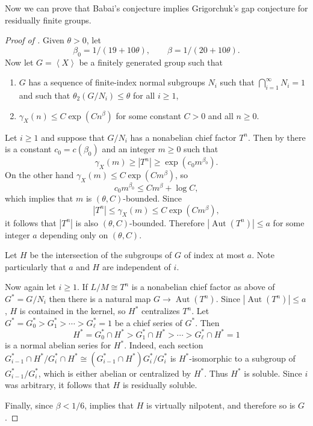 \documentclass[11pt,reqno]{amsart}
\numberwithin{equation}{section}
\theoremstyle{definition}
\theoremstyle{remark}
\newcommand\opr[1]{\operatorname{#1}}
\def\Aut{\opr{Aut}}
\newcommand\gen[1]{\left\langle#1\right\rangle}
\numberwithin{equation}{section}
\begin{document}
Now we can prove that Babai's conjecture implies Grigorchuk's gap conjecture for residually finite groups.

\begin{proof}[Proof of ]
    Given $\theta > 0$, let
    \[
        \beta_0 = 1/(19 + 10 \theta), \qquad \beta = 1 / (20 + 10 \theta).
    \]
    Now let $G = \gen X$ be a finitely generated group such that
    \begin{enumerate}
        \item $G$ has a sequence of finite-index normal subgroups $N_i$ such that $\bigcap_{i=1}^\infty N_i = 1$ and such that $\theta_2(G/N_i) \le \theta$ for all $i \ge 1$,
        \item $\gamma_X(n) \le C \exp(C n^\beta)$ for some constant $C > 0$ and all $n \ge 0$.
    \end{enumerate}

    Let $i \ge 1$ and suppose that $G / N_i$ has a nonabelian chief factor $T^n$.
    Then by  there is a constant $c_0 = c(\beta_0)$ and an integer $m \ge 0$ such that
    \[
        \gamma_X(m) \ge |T^n| \ge \exp(c_0 m^{\beta_0}).
    \]
    On the other hand $\gamma_X(m) \le C \exp(C m^\beta)$, so
    \[
        c_0 m^{\beta_0} \le C m^\beta + \log C,
    \]
    which implies that $m$ is $(\theta, C)$-bounded.
    Since
    \[
        |T^n| \le \gamma_X(m) \le C \exp(C m^\beta),
    \]
    it follows that $|T^n|$ is also $(\theta, C)$-bounded.
    Therefore $|\Aut(T^n)| \le a$ for some integer $a$ depending only on $(\theta, C)$.

    Let $H$ be the intersection of the subgroups of $G$ of index at most $a$. Note particularly that $a$ and $H$ are independent of $i$.

    Now again let $i \ge 1$. If $L / M \cong T^n$ is a nonabelian chief factor as above of $G^* = G / N_i$ then there is a natural map $G \to \Aut(T^n)$. Since $|\Aut(T^n)| \le a$, $H$ is contained in the kernel, so $H^*$ centralizes $T^n$.
    Let $G^* = G^*_0 > G^*_1 > \cdots > G^*_\ell = 1$ be a chief series of $G^*$. Then
    \[
        H^* = G^*_0 \cap H^* > G^*_1 \cap H^* > \cdots > G^*_\ell \cap H^* = 1
    \]
    is a normal abelian series for $H^*$.
    Indeed, each section $G^*_{i-1} \cap H^* / G^*_i \cap H^* \cong (G_{i-1}^* \cap H^*) G^*_i / G^*_i$ is $H^*$-isomorphic to a subgroup of $G^*_{i-1} / G^*_{i}$, which is either abelian or centralized by $H^*$.
    Thus $H^*$ is soluble.
    Since $i$ was arbitrary, it follows that $H$ is residually soluble.

    Finally, since $\beta < 1/6$,  implies that $H$ is virtually nilpotent, and therefore so is $G$.
\end{proof}
\end{document}
